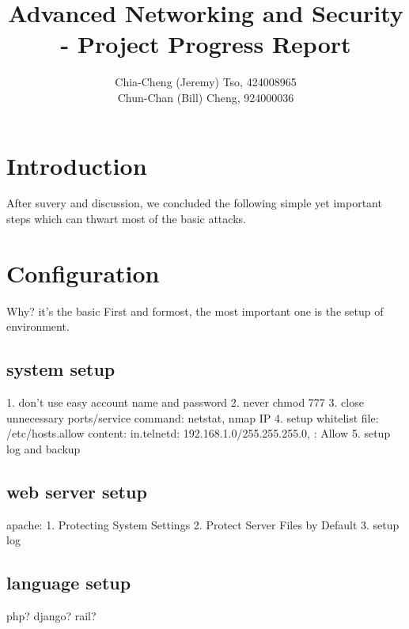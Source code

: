 \documentclass[12pt, a4paper]{article}
\title{
    Advanced Networking and Security\\
    - Project Progress Report 
    \vspace{-2ex}
}
\author{
    \normalfont \normalsize 
    Chia-Cheng (Jeremy) Tso, 
    424008965\\
    \normalfont \normalsize 
    Chun-Chan (Bill) Cheng, 
    924000036
}
\date{
    \normalfont \normalsize 
    \vspace{-5ex}
}
\begin{document}
\maketitle
\section{Introduction}
After suvery and discussion, we concluded the following simple yet important
steps which can thwart most of the basic attacks.

\section{Configuration}
Why? it's the basic
First and formost, the most important one is the setup of environment.
\subsection{system setup}
1. don't use easy account name and password
2. never chmod 777
3. close unnecessary ports/service
command: netstat, nmap IP
4. setup whitelist
file: /etc/hosts.allow
content: in.telnetd: 192.168.1.0/255.255.255.0, : Allow
5. setup log and backup

%

\subsection{web server setup}
apache:
1. Protecting System Settings
2. Protect Server Files by Default
3. setup log
\subsection{language setup}
php?
django?
rail?
\end{document}
